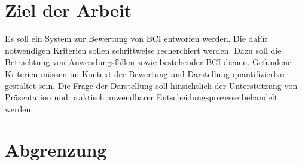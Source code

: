 \section{Ziel der Arbeit}


Es soll ein System zur Bewertung von \gls{BCI} entworfen werden.
Die dafür notwendigen Kriterien sollen schrittweise recherchiert werden.
Dazu soll die Betrachtung von Anwendungsfällen sowie bestehender \gls{BCI} dienen.
Gefundene Kriterien müssen im Kontext der Bewertung und Darstellung quantifizierbar gestaltet sein.
Die Frage der Darstellung soll hinsichtlich der Unterstützung von Präsentation und praktisch anwendbarer Entscheidungsprozesse behandelt werden.


\section{Abgrenzung}\label{sec:abgrenzung}

